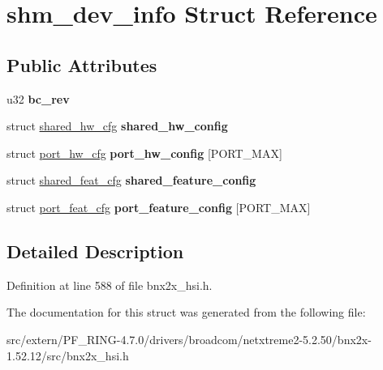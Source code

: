 \hypertarget{structshm__dev__info}{
\section{shm\_\-dev\_\-info Struct Reference}
\label{structshm__dev__info}
}
\subsection*{Public Attributes}
\begin{DoxyCompactItemize}
\item 
\hypertarget{structshm__dev__info_aeb93a5fbc3f903a4d515042f72b15d78}{
u32 {\bfseries bc\_\-rev}}
\label{structshm__dev__info_aeb93a5fbc3f903a4d515042f72b15d78}

\item 
\hypertarget{structshm__dev__info_a78ce6e0108283d9cb0982e14023bd52f}{
struct \hyperlink{structshared__hw__cfg}{shared\_\-hw\_\-cfg} {\bfseries shared\_\-hw\_\-config}}
\label{structshm__dev__info_a78ce6e0108283d9cb0982e14023bd52f}

\item 
\hypertarget{structshm__dev__info_a53971445d8d361ae8e037094ef27adad}{
struct \hyperlink{structport__hw__cfg}{port\_\-hw\_\-cfg} {\bfseries port\_\-hw\_\-config} \mbox{[}PORT\_\-MAX\mbox{]}}
\label{structshm__dev__info_a53971445d8d361ae8e037094ef27adad}

\item 
\hypertarget{structshm__dev__info_a6f8d74a985c84128895af36d2866c548}{
struct \hyperlink{structshared__feat__cfg}{shared\_\-feat\_\-cfg} {\bfseries shared\_\-feature\_\-config}}
\label{structshm__dev__info_a6f8d74a985c84128895af36d2866c548}

\item 
\hypertarget{structshm__dev__info_ac0fff8073e1afc35dda0ae4f81f48363}{
struct \hyperlink{structport__feat__cfg}{port\_\-feat\_\-cfg} {\bfseries port\_\-feature\_\-config} \mbox{[}PORT\_\-MAX\mbox{]}}
\label{structshm__dev__info_ac0fff8073e1afc35dda0ae4f81f48363}

\end{DoxyCompactItemize}


\subsection{Detailed Description}


Definition at line 588 of file bnx2x\_\-hsi.h.



The documentation for this struct was generated from the following file:\begin{DoxyCompactItemize}
\item 
src/extern/PF\_\-RING-\/4.7.0/drivers/broadcom/netxtreme2-\/5.2.50/bnx2x-\/1.52.12/src/bnx2x\_\-hsi.h\end{DoxyCompactItemize}
